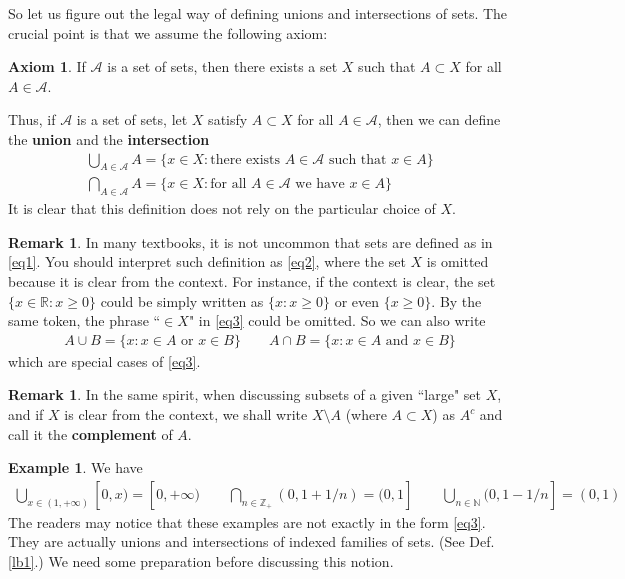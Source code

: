\documentclass[12pt,b5paper,notitlepage]{article}
\theoremstyle{definition}
\newtheorem{eg}[df]{Example}
\newtheorem{rem}[df]{Remark}
\newtheorem*{axiom}{Axiom}
\theoremstyle{plain}
\newcommand{\scr}{\mathscr}
\newcommand{\Nbb}{\mathbb N}
\newcommand{\Zbb}{\mathbb Z}
\newcommand{\Rbb}{\mathbb R}
\numberwithin{equation}{section}
\begin{document}
So let us figure out the legal way of defining unions and intersections of sets. The crucial point is that we assume the following axiom:
\begin{axiom}
If $\scr A$ is a set of sets, then there exists a set $X$ such that $A\subset X$ for all $A\in\scr A$.
\end{axiom}

Thus, if $\scr A$ is a set of sets, let $X$ satisfy $A\subset X$ for all $A\in\scr A$, then we can define the \textbf{union} and the \textbf{intersection} 
\begin{subequations}\label{eq3}
\begin{gather}
\bigcup_{A\in\scr A}A=\{x\in X:\text{there exists $A\in\scr A$ such that $x\in A$}\}\\
\bigcap_{A\in\scr A}A=\{x\in X:\text{for all $A\in\scr A$ we have $x\in A$}\}
\end{gather}
\end{subequations}
It is clear that this definition does not rely on the particular choice of $X$.

\begin{rem}
In many textbooks, it is not uncommon that sets are defined as in \eqref{eq1}. You should interpret such definition as \eqref{eq2}, where the set $X$ is omitted because it is clear from the context. For instance, if the context is clear, the set $\{x\in\Rbb:x\geq 0\}$ could be simply written as $\{x:x\geq0\}$ or even $\{x\geq0\}$. By the same token, the phrase ``$\in X$" in \eqref{eq3} could be omitted. So we can also write
\begin{gather*}
A\cup B=\{x: x\in A\text{ or }x\in B\} \qquad  A\cap B=\{x: x\in A\text{ and }x\in B\}
\end{gather*}
which are special cases of \eqref{eq3}.
\end{rem}


\begin{rem}
In the same spirit, when discussing subsets of a given ``large" set $X$, and if $X$ is clear from the context, we shall write $X\setminus A$ (where $A\subset X$) as $A^c$  and call it the \textbf{complement} of $A$.
\end{rem}


\begin{eg}
We have
\begin{gather*}
\bigcup_{x\in(1,+\infty)}[0,x)=[0,+\infty)\qquad\bigcap_{n\in\Zbb_+}(0,1+1/n)=(0,1]\qquad \bigcup_{n\in\Nbb}(0,1-1/n]=(0,1)
\end{gather*}
The readers may notice that these examples are not exactly in the form \eqref{eq3}. They are actually unions and intersections of indexed families of sets. (See Def. \ref{lb1}.) We need some preparation before discussing this notion.
\end{eg}
\end{document}
